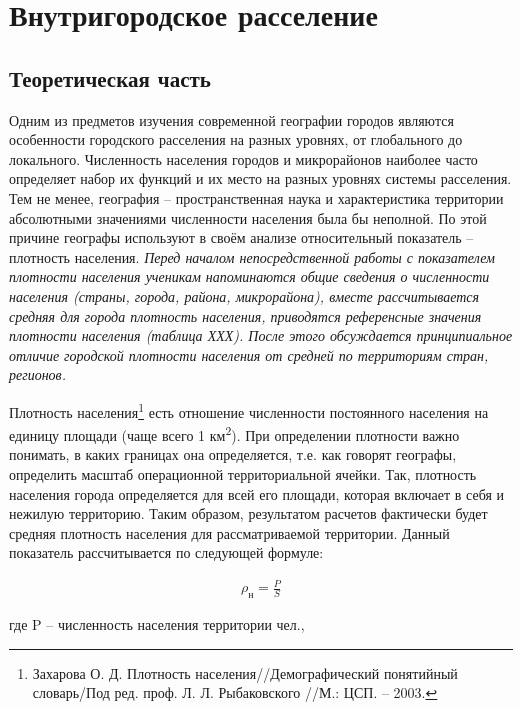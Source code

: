 \documentclass[
  11pt,
]{book}
\begin{document}
\chapter{Внутригородское расселение}\label{Settlement}

\section*{Теоретическая часть}\label{ux442ux435ux43eux440ux435ux442ux438ux447ux435ux441ux43aux430ux44f-ux447ux430ux441ux442ux44c-1}

Одним из предметов изучения современной географии городов являются особенности городского расселения на разных уровнях, от глобального до локального. Численность населения городов и микрорайонов наиболее часто определяет набор их функций и их место на разных уровнях системы расселения. Тем не менее, география -- пространственная наука и характеристика территории абсолютными значениями численности населения была бы неполной. По этой причине географы используют в своём анализе относительный показатель -- плотность населения. \emph{Перед началом непосредственной работы с показателем плотности населения ученикам напоминаются общие сведения о численности населения (страны, города, района, микрорайона), вместе рассчитывается средняя для города плотность населения, приводятся референсные значения плотности населения (таблица ХХХ). После этого обсуждается принципиальное отличие городской плотности населения от средней по территориям стран, регионов.}

Плотность населения\footnote{Захарова О. Д. Плотность населения//Демографический понятийный словарь/Под ред. проф. Л. Л. Рыбаковского //М.: ЦСП. -- 2003.} есть отношение численности постоянного населения на единицу площади (чаще всего 1 км\textsuperscript{2}). При определении плотности важно понимать, в каких границах она определяется, т.е. как говорят географы, определить масштаб операционной территориальной ячейки. Так, плотность населения города определяется для всей его площади, которая включает в себя и нежилую территорию. Таким образом, результатом расчетов фактически будет средняя плотность населения для рассматриваемой территории. Данный показатель рассчитывается по следующей формуле:

\begin{align*}
\rho_н = \frac{P}{S}
\end{align*}

где P -- численность населения территории чел.,
\end{document}
